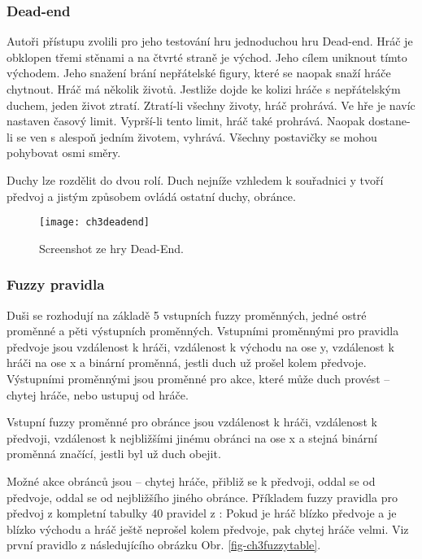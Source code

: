 \subsubsection{Dead-end}

Autoři přístupu zvolili pro jeho testování hru jednoduchou hru Dead-end. Hráč je obklopen třemi stěnami a na čtvrté straně je východ. Jeho cílem uniknout tímto východem. Jeho snažení brání nepřátelské figury, které se naopak snaží hráče chytnout. Hráč má několik životů. Jestliže dojde ke kolizi hráče s nepřátelským duchem, jeden život ztratí. Ztratí-li všechny životy, hráč prohrává. Ve hře je navíc nastaven časový limit. Vyprší-li tento limit, hráč také prohrává. Naopak dostane-li se ven s alespoň jedním životem, vyhrává. Všechny postavičky se mohou pohybovat osmi směry.

Duchy lze rozdělit do dvou rolí. Duch nejníže vzhledem k souřadnici y tvoří předvoj a jistým způsobem ovládá ostatní duchy, obránce.

\begin{figure}
  \centering
  \texttt{[image: ch3deadend]}
	\caption{Screenshot ze hry Dead-End. \cite{25deadend} }
	\label{ch3deadend}
\end{figure}

\subsubsection{Fuzzy pravidla}

Duši se rozhodují na základě 5 vstupních fuzzy proměnných, jedné ostré proměnné a pěti výstupních proměnných.
Vstupními proměnnými pro pravidla předvoje jsou vzdálenost k hráči, vzdálenost k východu na ose y,  vzdálenost k hráči na ose x a binární proměnná, jestli duch už prošel kolem předvoje. Výstupními proměnnými jsou proměnné pro akce, které může duch provést – chytej hráče, nebo ustupuj od hráče.

Vstupní fuzzy proměnné pro obránce jsou vzdálenost k hráči, vzdálenost k předvoji, vzdálenost k nejbližšími jinému obránci na ose x a stejná binární proměnná značící, jestli byl už duch obejit.

Možné akce obránců jsou – chytej hráče, přibliž se k předvoji, oddal se od předvoje, oddal se od nejbližšího jiného obránce.
Příkladem fuzzy pravidla pro předvoj z kompletní tabulky 40 pravidel z \cite{25deadend} :
Pokud je hráč blízko předvoje a je blízko východu a hráč ještě neprošel kolem předvoje, pak chytej hráče velmi. Viz první pravidlo z následujícího obrázku Obr. \ref{fig-ch3fuzzytable}.

